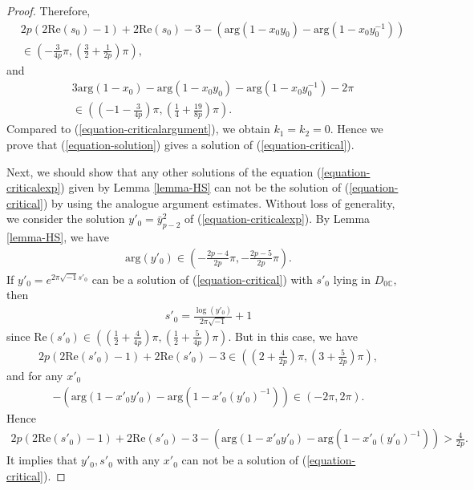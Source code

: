 \documentclass[12pt]{amsart}
\begin{document}
\begin{proof}
Therefore, 
\begin{align}
 &2p(2\text{Re}(s_0)-1)+2\text{Re}(s_0)-3-\left(\text{arg}(1-x_0y_0)-\text{arg}(1-x_0y_0^{-1})\right)\\\nonumber
 &\in \left(-\frac{3}{4p}\pi,\left(\frac{3}{2}+\frac{1}{2p}\right)\pi\right),   
\end{align}
and 
\begin{align}
    &3\text{arg}(1-x_0)-\text{arg}(1-x_0y_0)-\text{arg}(1-x_0y_0^{-1})-2\pi\\\nonumber
    &\in \left(\left(-1-\frac{3}{4p}\right)\pi,\left(\frac{1}{4}+\frac{19}{8p}\right)\pi\right).
\end{align}
Compared to (\ref{equation-criticalargument}), we obtain $k_1=k_2=0$. Hence we prove that 
(\ref{equation-solution}) gives a solution of (\ref{equation-critical}). 

Next, we should show that any other solutions of the equation (\ref{equation-criticalexp}) given by Lemma \ref{lemma-HS} can not be the solution of (\ref{equation-critical}) by using the analogue argument estimates. Without loss of generality, we consider the solution $y'_0=\bar{y}_{p-2}^{2}$ of (\ref{equation-criticalexp}). By Lemma \ref{lemma-HS}, we have 
\begin{align}
\text{arg}(y'_0)\in \left(-\frac{2p-4}{2p}\pi,-\frac{2p-5}{2p}\pi\right).   
\end{align}
If $y'_0=e^{2\pi\sqrt{-1}s'_0}$ can be a solution of (\ref{equation-critical}) with $s'_0$ lying in $D_{0\mathbb{C}}$, then
\begin{align}
s'_0=\frac{\log(y'_0)}{2\pi\sqrt{-1}}+1   
\end{align}
since $\text{Re}(s'_0)\in \left(\left(\frac{1}{2}+\frac{4}{4p}\right)\pi,\left(\frac{1}{2}+\frac{5}{4p}\right)\pi\right)$. But in this case, we have
\begin{align}
   2p(2\text{Re}(s'_0)-1)+2\text{Re}(s'_0)-3\in \left(\left(2+\frac{4}{2p}\right)\pi,\left(3+\frac{5}{2p}\right)\pi\right), 
\end{align}
and for any $x'_0$
\begin{align}
 -\left(\text{arg}(1-x'_0y'_0)-\text{arg}(1-x'_0(y'_0)^{-1})\right)\in (-2\pi,2\pi).   
\end{align}
Hence
    \begin{align}
 2p(2\text{Re}(s'_0)-1)+2\text{Re}(s'_0)-3-\left(\text{arg}(1-x'_0y'_0)-\text{arg}(1-x'_0(y'_0)^{-1})\right)>\frac{4}{2p}.   
\end{align}
It implies that $y'_0, s'_0$ with any $x'_0$ can not be a solution of (\ref{equation-critical}). 

\end{proof}
\end{document}
